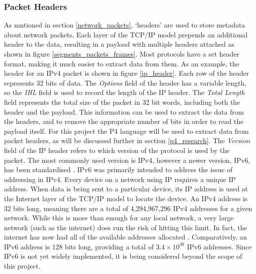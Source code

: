 \documentclass[12pt, a4paper, twoside, onecolumn]{article}
\begin{document}

\subsubsection{Packet Headers}
As mntioned in section \ref{network_packets}, `headers' are used to store metadata about network packets. Each layer of the TCP/IP model prepends an additional header to the data, resulting in a payload with multiple headers attached as shown in figure \ref{segments_packets_frames}. Most protocols have a set header format, making it much easier to extract data from them. As an example, the header for an IPv4 packet is shown in figure \ref{ip_header}. Each row of the header represents 32 bits of data. The \textit{Options} field of the header has a variable length, so the \textit{IHL} field is used to record the length of the IP header. The \textit{Total Length} field represents the total size of the packet in 32 bit words, including both the header and the payload. This information can be used to extract the data from the headers, and to remove the appropriate number of bits in order to read the payload itself. For this project the P4 language \cite{P4} will be used to extract data from packet headers, as will be discussed further in section \ref{p4_research}.
The \textit{Version} field of the IP header refers to which version of the protocol is used by the packet. The most commonly used version is IPv4, however a newer version, IPv6, has been standardised \cite{rfc1883} \cite{rfc8200}. IPv6 was primarily intended to address the issue of addressing in IPv4. Every device on a network using IP requires a unique IP address. When data is being sent to a particular device, its IP address is used at the Internet layer of the TCP/IP model to locate the device. An IPv4 address is 32 bits long, meaning there are a total of 4,294,967,296 IPv4 addresses for a given network. While this is more than enough for any local network, a very large network (such as the internet) does run the risk of hitting this limit. In fact, the internet has now had all of the available addresses allocated \cite{iana_ipv4_address_space_registry}. Comparatively, an IPv6 address is 128 bits long, providing a total of $3.4 \times 10^38$ IPv6 addresses. Since IPv6 is not yet widely implemented, it is being considered beyond the scope of this project.
\end{document}
